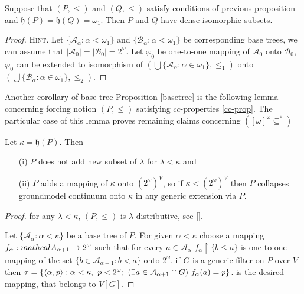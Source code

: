 \begin{corollary}
 Suppose that $(P,\leq)$ and $(Q,\leq)$ satisfy conditions of previous proposition
and $\mathfrak h(P) = \mathfrak h(Q) = \omega_1$. Then $P$ and $Q$ have dense
isomorphic subsets.
\end{corollary}

\begin{proof}{\scshape Hint.}
 Let $\{\mathcal A_\alpha : \alpha < \omega_1 \}$ and
$\{\mathcal B_\alpha : \alpha < \omega_1 \}$ be corresponding base trees, we
can assume that $| \mathcal A_0 | = | \mathcal B_0 | = 2^\omega$. Let
$\varphi_0$   be one-to-one mapping of $\mathcal A_0$ onto
 $\mathcal B_0$, $\varphi_0$ can be extended to isomorphism of
$(\bigcup \{\mathcal A_\alpha : \alpha \in \omega_1 \},\leq_1)$ onto
$(\bigcup \{\mathcal B_\alpha : \alpha \in \omega_1 \},\leq_2)$.
\end{proof}

Another corollary of base tree Proposition \ref{basetree} is the
following lemma concerning forcing notion $(P,\leq)$ satisfying
$cc$-properties \eqref{cc-prop}. The particular case of this
lemma proves remaining claims concerning $([\omega]^\omega \subseteq^*)$

\begin{lemma}
 Let $\kappa = \mathfrak h(P)$. Then
\begin{itemize}
 \item[(i)] $P$ does not add new subset of $\lambda$ for $\lambda < \kappa$ and
 \item[(ii)] $P$ adds a  mapping of $\kappa$ onto $(2^\omega)^V$, so if
	$\kappa < (2^\omega)^V$ then $P$ collapses groundmodel continuum onto
	$\kappa$ in any generic extension via $P$.
\end{itemize}
\end{lemma}

\begin{proof}
 for any $\lambda < \kappa$, $(P,\leq)$
	is $\lambda$-distributive, see \ref{}.

 Let $\{\mathcal A_\alpha : \alpha < \kappa \}$
be a base tree of $P$. For given $\alpha < \kappa$ choose a mapping
$f_\alpha : \\mathcal A_{\alpha +1} \to 2^\omega$ such that for every
$a \in \mathcal A_\alpha$ $f_\alpha \upharpoonright \{b \leq a\}$
is one-to-one mapping of the set $\{b \in \mathcal A_{\alpha +1} : b < a \}$
onto $2^\omega$. if $G$ is a generic filter on $P$ over $V$ then
$\tau = \{ \langle \alpha, p \rangle : \alpha < \kappa, \ p < 2^\omega; \
	(\exists a \in \mathcal A_{\alpha+1} \cap G) \ f_\alpha(a) = p \}$.
is the desired mapping, that belongs to $V[G]$.
\end{proof}


